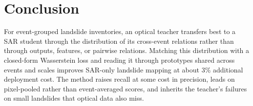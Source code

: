 \documentclass[journal]{IEEEtran}
\begin{document}
\section{Conclusion}
For event-grouped landslide inventories, an optical teacher transfers best to a SAR student through the distribution of its cross-event relations rather than through outputs, features, or pairwise relations. Matching this distribution with a closed-form Wasserstein loss and reading it through prototypes shared across events and scales improves SAR-only landslide mapping at about 3\% additional deployment cost. The method raises recall at some cost in precision, leads on pixel-pooled rather than event-averaged scores, and inherits the teacher's failures on small landslides that optical data also miss.



\end{document}
